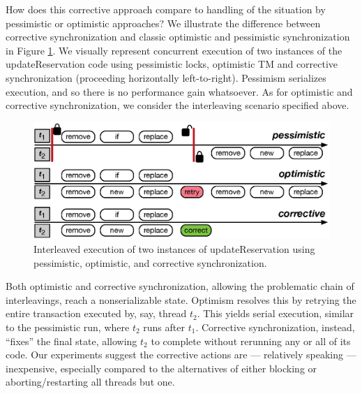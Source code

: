 How does this corrective approach compare to handling of the situation by pessimistic or optimistic approaches?
%
We illustrate the difference between corrective synchronization and classic optimistic and pessimistic synchronization in Figure \ref{Fi:motivatingOverview}. We visually represent concurrent execution of two instances of the \textsf{updateReservation} code using pessimistic locks, optimistic TM and corrective synchronization (proceeding horizontally left-to-right). Pessimism serializes execution, and so there is no performance gain whatsoever. As for optimistic and corrective synchronization, we consider the interleaving scenario specified above. %
%
\begin{figure}[t]
	\begin{center}
	\includegraphics[width=\textwidth]{diagram.eps}
	\end{center}
	\vspace{-0.6cm}\caption{\label{Fi:motivatingOverview}Interleaved execution of two instances of \textsf{updateReservation} using pessimistic, optimistic, and corrective synchronization.}
        \vspace{-0.4cm}
\end{figure}
%
Both optimistic and corrective synchronization, allowing the problematic chain of interleavings, reach a nonserializable state. Optimism resolves this by retrying the entire transaction executed by, say, thread $t_2$. This yields serial execution, similar to the pessimistic run, where $t_2$ runs after $t_1$. Corrective synchronization, instead, ``fixes'' the final state, allowing $t_2$ to complete without rerunning any or all of its code.
%
Our experiments suggest the corrective actions are --- relatively speaking --- inexpensive, especially compared to the alternatives of either blocking or aborting/restarting all threads but one.


